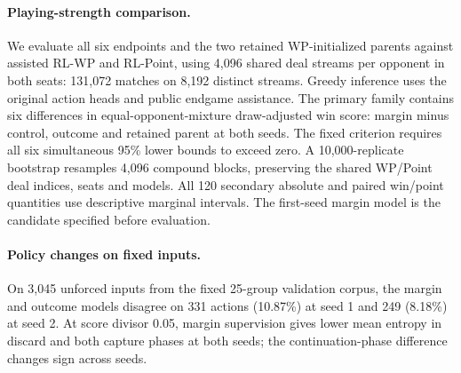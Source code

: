 \paragraph{Playing-strength comparison.}
We evaluate all six endpoints and the two retained WP-initialized parents against
assisted RL-WP and RL-Point, using 4,096 shared deal streams per opponent in both
seats: 131,072 matches on 8,192 distinct streams. Greedy inference uses the
original action heads and public endgame assistance. The primary family contains
six differences in equal-opponent-mixture draw-adjusted win score: margin minus
control, outcome and retained parent at both seeds. The fixed criterion requires
all six simultaneous 95\% lower bounds to exceed zero. A 10,000-replicate
bootstrap resamples 4,096 compound blocks, preserving the shared WP/Point deal
indices, seats and models. All 120 secondary absolute and paired win/point quantities use
descriptive marginal intervals. The first-seed margin model is the candidate
specified before evaluation.

\paragraph{Policy changes on fixed inputs.}
On 3,045 unforced inputs from the fixed 25-group validation corpus, the margin
and outcome models disagree on 331 actions (10.87\%) at seed 1 and 249 (8.18\%)
at seed 2. At score divisor 0.05, margin supervision gives lower mean entropy in
discard and both capture phases at both seeds; the continuation-phase difference
changes sign across seeds.
